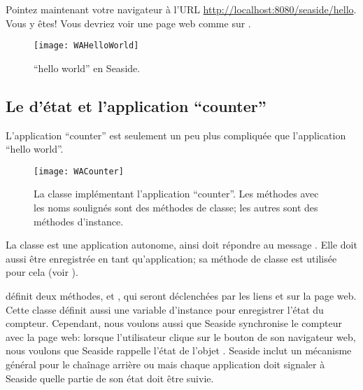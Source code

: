 \documentclass[a4paper,10pt,twoside]{book}
\begin{document}
Pointez maintenant votre navigateur 
à l'URL \url{http://localhost:8080/seaside/hello}.
Vous y êtes! Vous devriez voir une page web comme sur
 .

\begin{figure}[htb]
\begin{center}
\texttt{[image: WAHelloWorld]}
\caption{``hello world'' en Seaside.}
\end{center}
\end{figure}

\subsection{Le \backtracking d'état et l'application ``counter''}

L'application ``counter'' est seulement un peu plus compliquée que
l'application ``hello world''.

\begin{figure}[ht]
\begin{center}
\texttt{[image: WACounter]}
\caption{La classe  implémentant l'application
  ``counter''. Les méthodes avec les noms soulignés sont des méthodes
  de classe; les autres sont des méthodes d'instance.}
\end{center}
\end{figure}

La classe   est une application autonome,
ainsi  doit répondre  au message 
 .
Elle doit aussi être enregistrée en tant qu'application; sa méthode de
classe  est utilisée pour cela (voir
).

 définit deux méthodes,  et ,
qui seront déclenchées par les liens \link{++} et \link{{-}{-}} sur la
page web.
Cette classe définit aussi une variable d'instance 
  pour enregistrer l'état du compteur.
Cependant, nous voulons aussi que Seaside synchronise le compteur avec la page web:
lorsque l'utilisateur clique sur le bouton \backbtn{} de son
navigateur web, nous voulons que Seaside rappelle l'état de l'objet
.
Seaside inclut un mécanisme général pour le chaînage arrière ou
\backtracking mais chaque application doit signaler à Seaside quelle
partie de son état doit être suivie.
\end{document}
